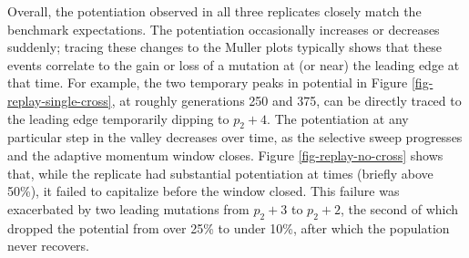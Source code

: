 Overall, the potentiation observed in all three replicates closely match the benchmark expectations. 
The potentiation occasionally increases or decreases suddenly; tracing these changes to the Muller plots typically shows that these events correlate to the gain or loss of a mutation at (or near) the leading edge at that time. 
For example, the two temporary peaks in potential in Figure \ref{fig-replay-single-cross}, at roughly generations 250 and 375, can be directly traced to the leading edge temporarily dipping to $p_{2} + 4$.
The potentiation at any particular step in the valley decreases over time, as the selective sweep progresses and the adaptive momentum window closes.
Figure \ref{fig-replay-no-cross} shows that, while the replicate had substantial potentiation at times (briefly above 50\%), it failed to capitalize before the window closed. 
This failure was exacerbated by two leading mutations from $p_{2} + 3$ to $p_{2} + 2$, the second of which dropped the potential from over 25\% to under 10\%, after which the population never recovers. 

